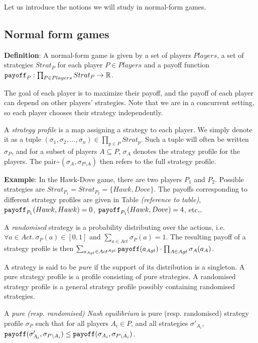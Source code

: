 Let us introduce the notions we will study in normal-form games.


\subsection{Normal form games}\label{normal-form-games}

\textbf{Definition}: A normal-form game is given by a set of players
\(Players\), a set of strategies \(Strat_P\) for each player
\(P \in Players\) and a payoff function
\({\tt payoff}_P : \prod_{P \in Players} Strat_P \to \mathbb{R}\).

The goal of each player is to maximize their payoff, and the payoff of
each player can depend on other players' strategies. Note that we are in
a concurrent setting, so each player chooses their strategy
independently.

A \emph{strategy profile} is a map assigning a strategy to each player.
We simply denote it as a tuple
\((\sigma_1,\sigma_2, \ldots,\sigma_n) \in \prod_{p \in P} Strat_p\).
Such a tuple will often be written \(\sigma_P\), and for a subset of
players \(A \subseteq P\), \(\sigma_A\) denotes the strategy profile for
the players. The
pair\textasciitilde{}\((\sigma_A,\sigma_{P\setminus A})\) then refers to
the full strategy profile.

\textbf{Example}: In the Hawk-Dove game, there are two players \(P_1\)
and \(P_2\). Possible strategies are
\(Strat_{P_1} = Strat_{P_2} = \{ Hawk, Dove \}\). The payoffs
corresponding to different strategy profiles are given in Table
\emph{(reference to table)}, \({\tt payoff}_{P_1}(Hawk, Hawk) = 0\),
\({\tt payoff}_{P_1}(Hawk, Dove) = 4\), etc\ldots{}

A \emph{randomised} strategy is a probability distributing over the
actions, i.e. \(\forall a\in Act.\ \sigma_P(a)\in[0,1]\) and
\(\sum_{a \in Act} \sigma_P(a) = 1\). The resulting payoff of a strategy
profile is then
\(\sum_{a_{Agt} \in Act^{Agt}} {\tt payoff}(a_{Agt}) \cdot \prod_{A\in Agt} \sigma_A(a_A)\).

A strategy is said to be \emph{pure} if the support of its distribution
is a singleton. A pure strategy profile is a profile consisting of pure
strategies. A randomised strategy profile is a general strategy profile
possibly containing randomised strategies.

A \emph{pure (resp. randomised) Nash equilibrium} is pure (resp.
randomised) strategy profile \(\sigma_P\) such that for all players
\(A_i\in P\), and all strategies \(\sigma'_{A_i}\),
\({\tt payoff}(\sigma'_{A_i}, \sigma_{P\setminus A_i}) \le {\tt payoff}(\sigma_{A_i}, \sigma_{P\setminus A_i})\).
